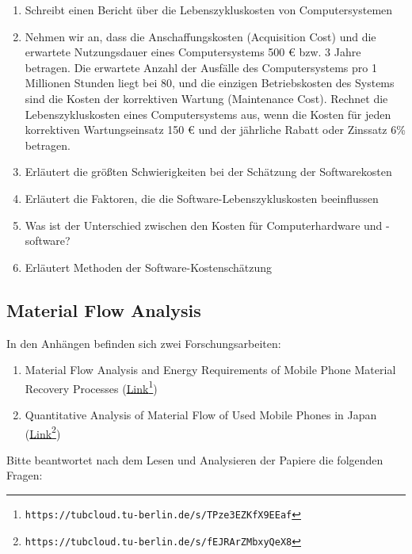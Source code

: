 \documentclass[DIV=15,headinclude=true]{scrartcl}
\begin{document}
\begin{enumerate}
	\item
	      Schreibt einen Bericht über die Lebenszykluskosten von
	      Computersystemen
	\item
	      Nehmen wir an, dass die Anschaffungskosten (Acquisition Cost) und die
	      erwartete Nutzungsdauer eines Computersystems 500 € bzw. 3 Jahre
	      betragen. Die erwartete Anzahl der Ausfälle des Computersystems pro 1
	      Millionen Stunden liegt bei 80, und die einzigen Betriebskosten des
	      Systems sind die Kosten der korrektiven Wartung (Maintenance Cost).
	      Rechnet die Lebenszykluskosten eines Computersystems aus, wenn die
	      Kosten für jeden korrektiven Wartungseinsatz 150 € und der jährliche
	      Rabatt oder Zinssatz 6\% betragen.
	\item
	      Erläutert die größten Schwierigkeiten bei der Schätzung der
	      Softwarekosten
	\item
	      Erläutert die Faktoren, die die Software-Lebenszykluskosten
	      beeinflussen
	\item
	      Was ist der Unterschied zwischen den Kosten für Computerhardware und
	      -software?
	\item
	      Erläutert Methoden der Software-Kostenschätzung
\end{enumerate}

\subsection{Material Flow Analysis}

In den Anhängen befinden sich zwei Forschungsarbeiten:

\begin{enumerate}
	\item
	      Material Flow Analysis and Energy Requirements of Mobile Phone
	      Material Recovery Processes
	      (\href{https://tubcloud.tu-berlin.de/s/TPze3EZKfX9EEaf}{Link}\footnote{\texttt{https://tubcloud.tu-berlin.de/s/TPze3EZKfX9EEaf}})
	\item
	      Quantitative Analysis of Material Flow of Used Mobile Phones in Japan
	      (\href{https://tubcloud.tu-berlin.de/s/fEJRArZMbxyQeX8}{Link}\footnote{\texttt{https://tubcloud.tu-berlin.de/s/fEJRArZMbxyQeX8}})
\end{enumerate}

Bitte beantwortet nach dem Lesen und Analysieren der Papiere die
folgenden Fragen:
\end{document}
